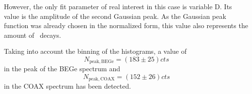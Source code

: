 \documentclass[encoding=utf8,british]{tumphthesis}
\begin{document}

However, the only fit parameter of real interest in this case is variable D.
Its value is the amplitude of the second Gaussian peak.
As the Gaussian peak function was already chosen in the normalized form, this value also represents the amount of \Kr\ decays.

Taking into account the binning of the histograms, a value of  
\begin{equation*}
N_{\mathrm{peak,BEGe}} = (183\pm25) \unit{cts}
\end{equation*} in the peak of the BEGe spectrum and
\begin{equation*}
N_{\mathrm{peak,COAX}} = (152\pm26) \unit{cts}
\end{equation*}in the COAX spectrum has been detected.
\\
\end{document}

